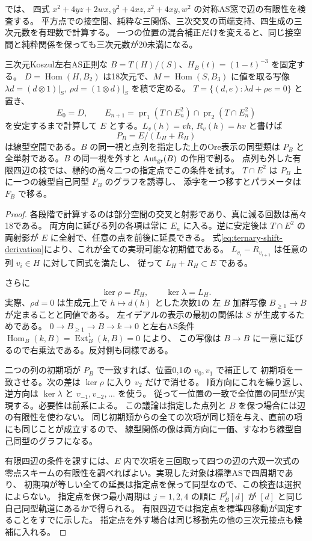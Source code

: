  では、
四式 $x^2+4yz+2wx,y^2+4xz,z^2+4xy,w^2$ の対称AS窓で辺の有限性を検査する。
平方点での接空間、純粋な三関係、三次交叉の両端支持、四生成の三次元数を有理数で計算する。
一つの位置の混合補正だけを変えると、同じ接空間と純粋関係を保っても三次元数が20未満になる。

\begin{theorem}[一位置の線型パラメータと移動作用]\label{thm:ternary-ore-linear-space}
三次元Koszul左右AS正則な $B=T(H)/(S)$、$H_B(t)=(1-t)^{-3}$ を固定する。
$D=\operatorname{Hom}(H,B_2)$ は18次元で、$M=\operatorname{Hom}(S,B_3)$ に値を取る写像
$\lambda d=(d\otimes1)|_S$, $\rho d=(1\otimes d)|_S$ を積で定める。
$T=\{(d,e):\lambda d+\rho e=0\}$ と置き、
\[
 E_0=D,\qquad E_{n+1}=\operatorname{pr}_1(T\cap E_n^2)
                 \cap\operatorname{pr}_2(T\cap E_n^2)
\]
を安定するまで計算して $E$ とする。$L_v(h)=vh$, $R_v(h)=hv$ と書けば
\[
                 P_B=E/(L_H+R_H)
\]
は線型空間である。$B$ の同一視と点列を指定した上のOre表示の同型類は
$P_B$ と全単射である。$B$ の同一視を外すと $\operatorname{Aut}_{\mathrm{gr}}(B)$ の作用で割る。
点列も外した有限四辺の枝では、標的の高々二つの指定点でこの条件を試す。
$T\cap E^2$ は $P_B$ 上に一つの線型自己同型 $F_B$ のグラフを誘導し、
添字を一つ移すとパラメータは $F_B$ で移る。
\end{theorem}
\begin{proof}
各段階で計算するのは部分空間の交叉と射影であり、真に減る回数は高々18である。
両方向に延びる列の各項は常に $E_n$ に入る。逆に安定後は
$T\cap E^2$ の両射影が $E$ に全射で、任意の点を前後に延長できる。
式\eqref{eq:ternary-shift-derivation}により、これが全ての実現可能な初期値である。
$L_{v_i}-R_{v_{i+1}}$ は任意の列 $v_i\in H$ に対して同式を満たし、
従って $L_H+R_H\subset E$ である。

さらに
\[
                   \ker\rho=R_H,\qquad \ker\lambda=L_H .
\]
実際、$\rho d=0$ は生成元上で $h\mapsto d(h)$ とした次数1の
左 $B$ 加群写像 $B_{\ge1}\to B$ が定まることと同値である。
左イデアルの表示の最初の関係は $S$ が生成するためである。
$0\to B_{\ge1}\to B\to k\to0$ と左右AS条件
$\operatorname{Hom}_B(k,B)=\operatorname{Ext}^1_B(k,B)=0$ により、
この写像は $B\to B$ に一意に延びるので右乗法である。反対側も同様である。

二つの列の初期項が $P_B$ で一致すれば、位置0,1の $v_0,v_1$ で補正して
初期項を一致させる。次の差は $\ker\rho$ に入り $v_2$ だけで消せる。
順方向にこれを繰り返し、逆方向は $\ker\lambda$ と $v_{-1},v_{-2},\ldots$ を使う。
従って一位置の一致で全位置の同型が実現する。必要性は前系による。
この議論は指定した点列と $B$ を保つ場合には辺の有限性を使わない。
同じ初期類からの全ての次項が同じ類を与え、直前の項にも同じことが成立するので、
線型関係の像は両方向に一価、すなわち線型自己同型のグラフになる。

有限四辺の条件を課すには、$E$ 内で次項を三回取って四つの辺の六双一次式の
零点スキームの有限性を調べればよい。実現した対象は標準ASで四周期であり、
初期項が等しい全ての延長は指定点を保って同型なので、この検査は選択によらない。
指定点を保つ最小周期は $j=1,2,4$ の順に
$F_B^j[d]$ が $[d]$ と同じ自己同型軌道にあるかで得られる。
有限四辺では指定点を標準四移動が固定することをすでに示した。
指定点を外す場合は同じ移動先の他の三次元接点も候補に入れる。
\end{proof}

